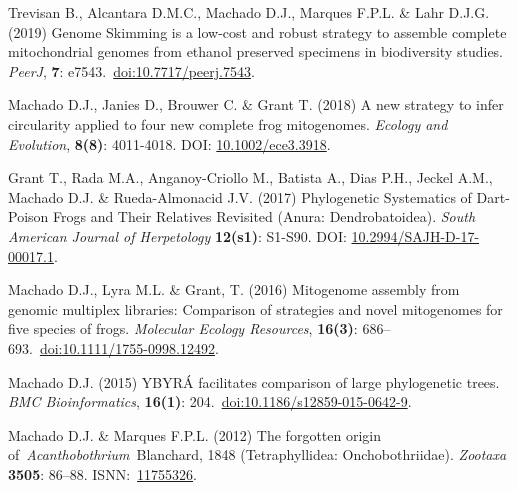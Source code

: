 {\begin{hangparas}{.25in}{1}
		Trevisan B., Alcantara D.M.C., Machado D.J., Marques F.P.L. \& Lahr D.J.G. (2019) Genome Skimming is a low-cost and robust strategy to assemble complete mitochondrial genomes from ethanol preserved specimens in biodiversity studies. \emph{PeerJ}, \textbf{7}: e7543.~\href{https://doi.org/10.7717/peerj.7543}{doi:10.7717/peerj.7543}.

		Machado D.J., Janies D., Brouwer C. \& Grant T. (2018) A new strategy to infer circularity applied to four new complete frog mitogenomes. \emph{Ecology and Evolution}, \textbf{8(8)}: 4011-4018. DOI: \href{http://doi.wiley.com/10.1002/ece3.3918}{10.1002/ece3.3918}.

		Grant T., Rada M.A., Anganoy-Criollo M., Batista A., Dias P.H., Jeckel A.M., Machado D.J. \& Rueda-Almonacid J.V. (2017) Phylogenetic Systematics of Dart-Poison Frogs and Their Relatives Revisited (Anura: Dendrobatoidea). \emph{South American Journal of Herpetology} \textbf{12(s1)}: S1-S90. DOI: \href{http://www.bioone.org/doi/10.2994/SAJH-D-17-00017.1}{10.2994/SAJH-D-17-00017.1}.

		Machado D.J., Lyra M.L. \& Grant, T. (2016) Mitogenome assembly from genomic multiplex libraries: Comparison of strategies and novel mitogenomes for five species of frogs. \emph{Molecular Ecology Resources}, \textbf{16(3)}: 686--693.~\href{https://doi.org/10.1111/1755-0998.12492}{doi:10.1111/1755-0998.12492}.

		Machado D.J. (2015) YBYRÁ facilitates comparison of large phylogenetic trees. \emph{BMC Bioinformatics}, \textbf{16(1)}: 204.~\href{https://doi.org/10.1186/s12859-015-0642-9}{doi:10.1186/s12859-015-0642-9}.

		Machado D.J. \& Marques F.P.L. (2012) The forgotten origin of~\emph{Acanthobothrium}~Blanchard, 1848 (Tetraphyllidea: Onchobothriidae). \emph{Zootaxa} \textbf{3505}: 86--88. ISNN:~\href{http://www.mapress.com/zootaxa/2012/f/z03505p088f.pdf}{11755326}.

		\end{hangparas}
	}


		
